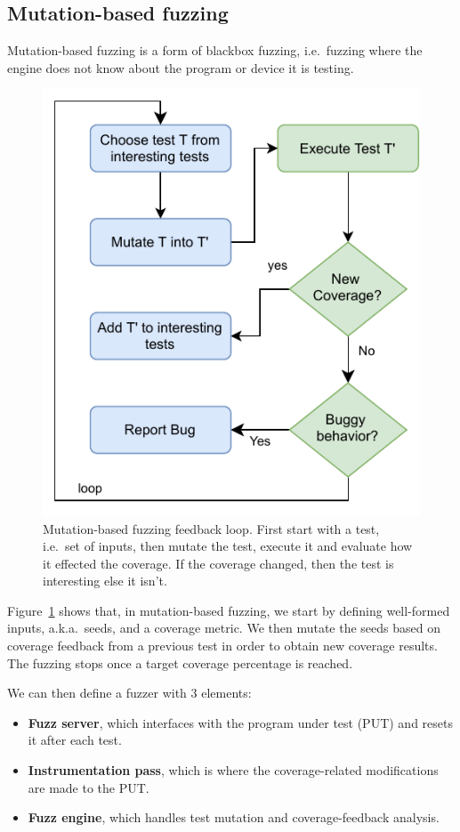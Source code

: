 \documentclass[conference]{IEEEtran}
\newcommand{\todo}[1]{{\color{olive} TODO: #1}}
\begin{document}
\subsection{Mutation-based fuzzing}
Mutation-based fuzzing is a form of blackbox fuzzing, i.e.\ fuzzing where the engine does not know about the program or device it is testing.
\begin{figure}
  \centering
    \includegraphics[width=0.7\linewidth]{mutation-fuzzing.pdf}
    \caption{Mutation-based fuzzing feedback loop. First start with a test, i.e.\ set of inputs, then mutate the test, execute it and evaluate how it effected the coverage. If the coverage changed, then the test is interesting else it isn't.}
\label{fig:mut-fuzz}
\end{figure}

Figure~\ref{fig:mut-fuzz} shows that, in mutation-based fuzzing, we start by defining well-formed inputs, a.k.a.\ seeds, and a coverage metric. 
We then mutate the seeds based on coverage feedback from a previous test in order to obtain new coverage results. 
The fuzzing stops once a target coverage percentage is reached.

We can then define a fuzzer with 3 elements:
\begin{itemize}
\item \textbf{Fuzz server}, which interfaces with the program under test (PUT) and resets it after each test.
\item \textbf{Instrumentation pass}, which is where the coverage-related modifications are made to the PUT.
\item \textbf{Fuzz engine}, which handles test mutation and coverage-feedback analysis.
\end{itemize}
\end{document}
